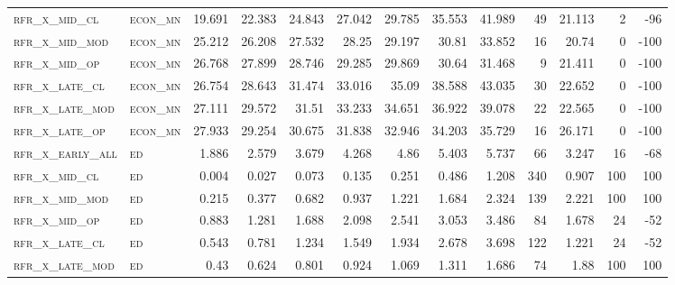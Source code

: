 \begin{landscape}
\begin{center}
\begin{footnotesize}
\begin{longtable}{llrrrrrrrr|rrr}
\textsc{rfr\_x\_mid\_cl   } & \textsc{econ\_mn  }   & 19.691  & 22.383  & 24.843  & 27.042   & 29.785   & 35.553   & 41.989   & 49     & 21.113        & 2             & -96             \\
\textsc{rfr\_x\_mid\_mod  } & \textsc{econ\_mn  }   & 25.212  & 26.208  & 27.532  & 28.25    & 29.197   & 30.81    & 33.852   & 16     & 20.74         & 0             & -100            \\
\textsc{rfr\_x\_mid\_op   } & \textsc{econ\_mn  }   & 26.768  & 27.899  & 28.746  & 29.285   & 29.869   & 30.64    & 31.468   & 9      & 21.411        & 0             & -100            \\
\textsc{rfr\_x\_late\_cl  } & \textsc{econ\_mn  }   & 26.754  & 28.643  & 31.474  & 33.016   & 35.09    & 38.588   & 43.035   & 30     & 22.652        & 0             & -100            \\
\textsc{rfr\_x\_late\_mod } & \textsc{econ\_mn  }   & 27.111  & 29.572  & 31.51   & 33.233   & 34.651   & 36.922   & 39.078   & 22     & 22.565        & 0             & -100            \\
\textsc{rfr\_x\_late\_op  } & \textsc{econ\_mn  }   & 27.933  & 29.254  & 30.675  & 31.838   & 32.946   & 34.203   & 35.729   & 16     & 26.171        & 0             & -100            \\
\textsc{rfr\_x\_early\_all} & \textsc{ed        }   & 1.886   & 2.579   & 3.679   & 4.268    & 4.86     & 5.403    & 5.737    & 66     & 3.247         & 16            & -68             \\
\textsc{rfr\_x\_mid\_cl   } & \textsc{ed        }   & 0.004   & 0.027   & 0.073   & 0.135    & 0.251    & 0.486    & 1.208    & 340    & 0.907         & 100           & 100             \\
\textsc{rfr\_x\_mid\_mod  } & \textsc{ed        }   & 0.215   & 0.377   & 0.682   & 0.937    & 1.221    & 1.684    & 2.324    & 139    & 2.221         & 100           & 100             \\
\textsc{rfr\_x\_mid\_op   } & \textsc{ed        }   & 0.883   & 1.281   & 1.688   & 2.098    & 2.541    & 3.053    & 3.486    & 84     & 1.678         & 24            & -52             \\
\textsc{rfr\_x\_late\_cl  } & \textsc{ed        }   & 0.543   & 0.781   & 1.234   & 1.549    & 1.934    & 2.678    & 3.698    & 122    & 1.221         & 24            & -52             \\
\textsc{rfr\_x\_late\_mod } & \textsc{ed        }   & 0.43    & 0.624   & 0.801   & 0.924    & 1.069    & 1.311    & 1.686    & 74     & 1.88          & 100           & 100             \\

\end{longtable}
\end{footnotesize}
\end{center}
\end{landscape}
